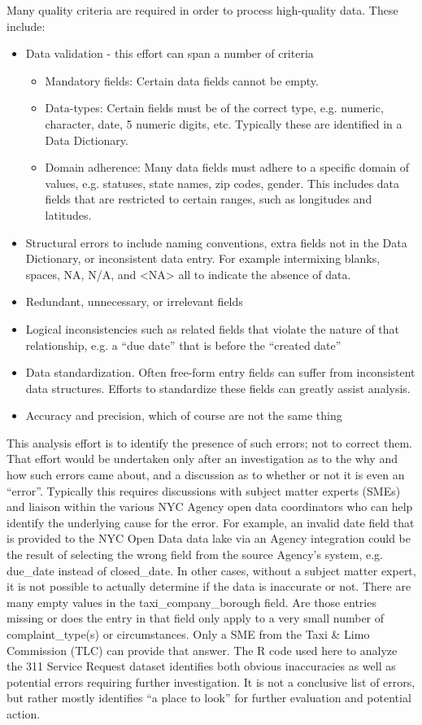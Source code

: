 \documentclass[12pt, titlepage]{article}
\begin{document}
Many quality criteria are required in order to process high-quality data. These include:

\begin{itemize}
	\item Data validation - this effort can span a number of criteria
	\begin{itemize}
		\item Mandatory fields: Certain data fields cannot be empty.
		\item Data-types: Certain fields must be of the correct type, e.g. numeric, character, date, 5 numeric digits, etc. Typically these are identified in a Data Dictionary.
		\item Domain adherence:  Many data fields must adhere to a specific domain of values, e.g. statuses, state names, zip codes, gender. This includes data
		fields that are restricted to certain ranges, such as longitudes and latitudes.
	\end{itemize}   
	\item Structural errors to include naming conventions, extra fields not in the Data Dictionary, or inconsistent data entry.
	For example intermixing blanks, spaces, NA, N/A, and \textless{}NA\textgreater{} all to indicate the absence of data.
	\item Redundant, unnecessary, or irrelevant fields
	\item Logical inconsistencies such as related fields that violate the nature of that relationship, e.g. a ``due date'' that is before the ``created date''
	\item Data standardization. Often free-form entry fields can suffer from inconsistent data structures. Efforts to standardize these fields can greatly assist analysis.
	\item Accuracy and precision, which of course are not the same thing 
\end{itemize}

This analysis effort is to identify the presence of such errors; not to correct them. That effort would be undertaken only after an investigation as to the why
and how such errors came about, and a discussion as to whether or not it is even an ``error''. Typically this requires discussions with subject matter experts (SMEs)
 and liaison within the various NYC Agency open data coordinators who can help identify the underlying cause for the error.
 For example, an invalid date field that is provided to the NYC Open Data data lake via an Agency integration could
be the result of selecting the wrong field from the source Agency's system, e.g. due\_date instead of closed\_date. In other cases, without a subject matter
expert, it is not possible to actually determine if the data is inaccurate or not. There are many empty values in the taxi\_company\_borough field. Are those
entries missing or does the entry in that field only apply to a very small number of complaint\_type(s) or circumstances. Only a SME
from the Taxi \& Limo Commission (TLC) can provide that answer. The R code used here to analyze the 311 Service Request dataset identifies
both obvious inaccuracies as well as potential errors requiring further investigation. It is not a conclusive list of errors, but rather mostly identifies
``a place to look'' for further evaluation and potential action.
\end{document}
